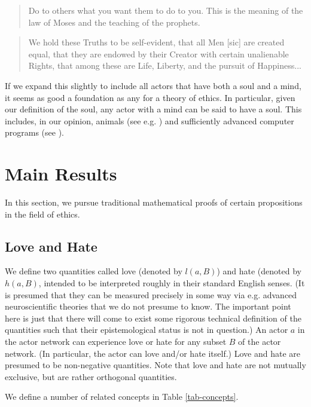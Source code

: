 \documentclass{article}
\begin{document}
\begin{quote}
  Do to others what you want them to do to you. This is the meaning of
  the law of Moses and the teaching of the prophets. \cite{mount}
\end{quote}

\begin{quote}
  We hold these Truths to be self-evident, that all Men [sic] are
  created equal, that they are endowed by their Creator with certain
  unalienable Rights, that among these are Life, Liberty, and the
  pursuit of Happiness... \cite{independence}
\end{quote}

If we expand this slightly to include all actors that have both a soul
and a mind, it seems as good a foundation as any for a theory of
ethics. In particular, given our definition of the soul, any actor
with a mind can be said to have a soul. This includes, in our opinion,
animals (see e.g. \cite{singer1995animal, coetzee1999lives}) and
sufficiently advanced computer programs (see
\cite{turing1954computing}).

\section{Main Results}

In this section, we pursue traditional mathematical proofs of certain
propositions in the field of ethics.

\subsection{Love and Hate}

We define two quantities called love (denoted by $l(a, B)$) and hate
(denoted by $h(a, B)$, intended to be interpreted roughly in their
standard English senses. (It is presumed that they can be measured
precisely in some way via e.g. advanced neuroscientific theories that
we do not presume to know. The important point here is just that there
will come to exist some rigorous technical definition of the
quantities such that their epistemological status is not in
question.) An actor $a$ in the actor network can experience love or
hate for any subset $B$ of the actor network. (In particular, the
actor can love and/or hate itself.) Love and hate are presumed to be
non-negative quantities. Note that love and hate are not mutually
exclusive, but are rather orthogonal quantities.

We define a number of related concepts in Table \ref{tab-concepts}.
\end{document}
